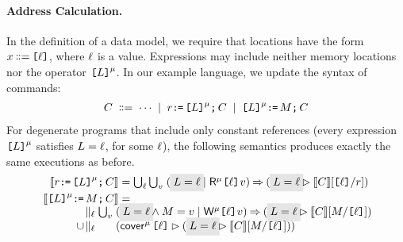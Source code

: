 \paragraph{Address Calculation.}
In the definition of a data model, we require
that locations have the form $x\!\!\;\mathrel{\mathord{\vcentcolon}\mkern-1mu\mathord{\vcentcolon}\mathord{{=}}}\;\!\!\texttt{[}\ell\texttt{]}$, where $\ell$
is a value.  Expressions may include neither memory locations nor the
operator $\texttt{[}L\texttt{]}^{\mu}$.
In our example language, we update the syntax of commands:
\begin{gather*}
  C
  \;\mathrel{\mathord{\vcentcolon}\mkern-1mu\mathord{\vcentcolon}\mathord{{=}}}\; \cdots
  \;\mathrel{|}\; r\texttt{:}\mkern-1mu\texttt{=}\,\texttt{[}L\texttt{]}^{\mu}\texttt{;}\,\allowbreak C 
  \;\mathrel{|}\; \texttt{[}L\texttt{]}^{\mu}\texttt{:}\mkern-1mu\texttt{=}\,M\texttt{;}\,\allowbreak C
\end{gather*}
For degenerate programs that include only constant references (every
expression $\texttt{[}L\texttt{]}^\mu$ satisfies $L=\ell$, for some $\ell$), the
following semantics produces exactly the same executions as before.
\begin{align*}
  \sem{\aReg\GETS\REF{\cExp}^\amode\SEMI \aCmd} & =
  \textstyle\bigcup_\cVal\bigcup_\aVal\; (\;\mathhl{\cExp=\cVal} \mid \DRmode{\REF{\cVal}}\aVal) \prefix (\;\mathhl{\cExp=\cVal} \guard\sem{\aCmd}[\REF{\cVal}/\aReg])
  \\
  \sem{\REF{\cExp}^\amode\GETS\aExp\SEMI \aCmd} & =
  \\[-1ex]
  &\mkern-68mu\hbox to 0pt{$\begin{aligned}
    &\textstyle\parallel_\cVal\bigcup_\aVal\;(\;\mathhl{\cExp=\cVal} \land \aExp=\aVal \mid \DWmode{\REF{\cVal}}\aVal) \prefix (\;\mathhl{\cExp=\cVal} \guard \sem{\aCmd}[\aExp/\REF{\cVal}])
    \\[-.5ex]  \cup\!&
    \textstyle\parallel_{\cVal}\phantom{\bigcup_\aVal}\; %
    (\relfilt{\REF{\cVal}} (\;\mathhl{\cExp=\cVal} \guard \sem{\aCmd}[\aExp/\REF{\cVal}]))
  \end{aligned}$}
\end{align*}
